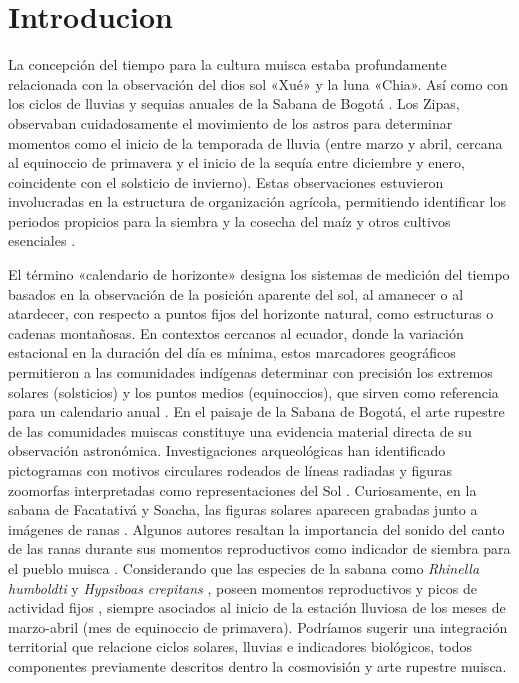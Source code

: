 \documentclass[a4paper,alpha-refs]{eSpectra}
\begin{document}
\section{Introducion}

La concepción del tiempo para la cultura muisca estaba profundamente relacionada con la observación del dios sol «Xué» y la luna «Chia». Así como con los ciclos de lluvias y sequias anuales de la Sabana de Bogotá \cite{langebaek_muiscas_2005}. Los Zipas, observaban cuidadosamente el movimiento de los astros para determinar momentos como el inicio de la temporada de lluvia (entre marzo y abril, cercana al equinoccio de primavera y el inicio de la sequía entre diciembre y enero, coincidente con el solsticio de invierno).  Estas observaciones estuvieron involucradas en la estructura de organización agrícola, permitiendo identificar los periodos propicios para la siembra y la cosecha del maíz y otros cultivos esenciales \cite{duquesne_calendario_acosta_1848}.

\smallskip

El término «calendario de horizonte» designa los sistemas de medición del tiempo basados en la observación de la posición aparente del sol, al amanecer o al atardecer, con respecto a puntos fijos del horizonte natural, como estructuras o cadenas montañosas. En contextos cercanos al ecuador, donde la variación estacional en la duración del día es mínima, estos marcadores geográficos permitieron a las comunidades indígenas determinar con precisión los extremos solares (solsticios) y los puntos medios (equinoccios), que sirven como referencia para un calendario anual \cite{quijano_astronomia_2021}. En el paisaje de la Sabana de Bogotá, el arte rupestre de las comunidades muiscas constituye una evidencia material directa de su observación astronómica. Investigaciones arqueológicas han identificado pictogramas con motivos circulares rodeados de líneas radiadas y figuras zoomorfas interpretadas como representaciones del Sol \cite{munoz_animales_2009, martinez_manual_2004}. Curiosamente, en la sabana de Facatativá y Soacha, las figuras solares aparecen grabadas junto a imágenes de ranas \cite{saenz_cepeda_2020}. Algunos autores resaltan la importancia del sonido del canto de las ranas durante sus momentos reproductivos como indicador de siembra para el pueblo muisca \cite{duquesne_calendario_acosta_1848}. Considerando que las especies de la sabana como \textit{Rhinella humboldti}  y  \textit{Hypsiboas crepitans} , poseen momentos reproductivos y picos de actividad fijos \cite{cortes_gallo_ecologia_reproductiva_2024}, siempre asociados al inicio de la estación lluviosa de los meses de marzo-abril (mes de equinoccio de primavera). Podríamos sugerir una integración territorial que relacione ciclos solares, lluvias e indicadores biológicos, todos componentes previamente descritos dentro la cosmovisión y arte rupestre muisca. 
\end{document}
